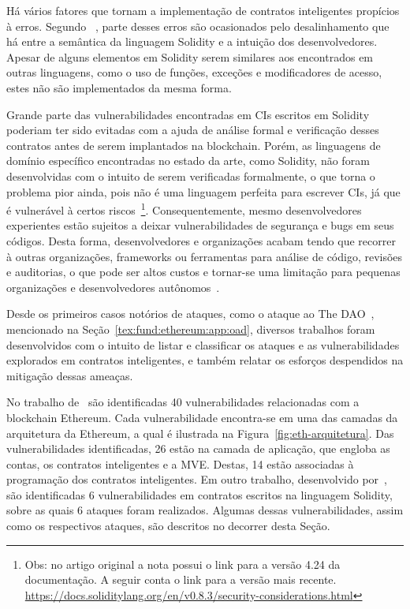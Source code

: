 Há vários fatores que tornam a implementação de contratos inteligentes propícios à erros. Segundo ~\cite{atzei2017survey-attacks-sok}, parte desses erros são ocasionados pelo desalinhamento que há entre a semântica da linguagem Solidity e a intuição dos desenvolvedores. Apesar de alguns elementos em Solidity serem similares aos encontrados em outras linguagens, como o uso de funções, exceções e modificadores de acesso, estes não são implementados da mesma forma.

Grande parte das vulnerabilidades encontradas em CIs escritos em Solidity poderiam ter sido evitadas com a ajuda de análise formal e verificação desses contratos antes de serem implantados na blockchain. Porém, as linguagens de domínio específico encontradas no estado da arte, como Solidity, não foram desenvolvidas com o intuito de serem verificadas formalmente, o que torna o problema pior ainda, pois não é uma linguagem perfeita para escrever CIs, já que é vulnerável à certos riscos~\footnote{Obs: no artigo original a nota possui o link para a versão 4.24 da documentação. A seguir conta o link para a versão mais recente. \url{https://docs.soliditylang.org/en/v0.8.3/security-considerations.html}}. Consequentemente, mesmo desenvolvedores experientes estão sujeitos a deixar vulnerabilidades de segurança e bugs em seus códigos. Desta forma, desenvolvedores e organizações acabam tendo que recorrer à outras organizações, frameworks ou ferramentas para análise de código, revisões e auditorias, o que pode ser altos custos e tornar-se uma limitação para pequenas organizações e desenvolvedores autônomos~\cite{singh2020survey-vulnerabilities-elsevier}.

Desde os primeiros casos notórios de ataques, como o ataque ao The DAO~\cite{siegel-dao-attack}, mencionado na Seção~\ref{tex:fund:ethereum:app:oad}, diversos trabalhos foram desenvolvidos com o intuito de listar e classificar os ataques e as vulnerabilidades explorados em contratos inteligentes, e também relatar os esforços despendidos na mitigação dessas ameaças. 

No trabalho de~ são identificadas 40 vulnerabilidades relacionadas com a blockchain Ethereum. Cada vulnerabilidade encontra-se em uma das camadas da arquitetura da Ethereum, a qual é ilustrada na Figura~\ref{fig:eth-arquitetura}. Das vulnerabilidades identificadas, 26 estão na camada de aplicação, que engloba as contas, os contratos inteligentes e a MVE. Destas, 14 estão associadas à programação dos contratos inteligentes. Em outro trabalho, desenvolvido por~, são identificadas 6 vulnerabilidades em contratos escritos na linguagem Solidity, sobre as quais 6 ataques foram realizados. Algumas dessas vulnerabilidades, assim como os respectivos ataques, são descritos no decorrer desta Seção.

